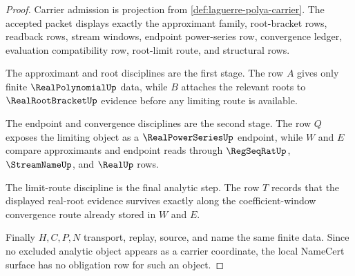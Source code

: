 \begin{proof}
Carrier admission is projection from \autoref{def:laguerre-polya-carrier}. The accepted packet displays exactly the approximant family, root-bracket rows, readback rows, stream windows, endpoint power-series row, convergence ledger, evaluation compatibility row, root-limit route, and structural rows.

The approximant and root disciplines are the first stage. The row $A$ gives only finite $\RealPolynomialUp$ data, while $B$ attaches the relevant roots to $\RealRootBracketUp$ evidence before any limiting route is available.

The endpoint and convergence disciplines are the second stage. The row $Q$ exposes the limiting object as a $\RealPowerSeriesUp$ endpoint, while $W$ and $E$ compare approximants and endpoint reads through $\RegSeqRatUp$, $\StreamNameUp$, and $\RealUp$ rows.

The limit-route discipline is the final analytic step. The row $T$ records that the displayed real-root evidence survives exactly along the coefficient-window convergence route already stored in $W$ and $E$.

Finally $H,C,P,N$ transport, replay, source, and name the same finite data. Since no excluded analytic object appears as a carrier coordinate, the local NameCert surface has no obligation row for such an object.
\end{proof}

